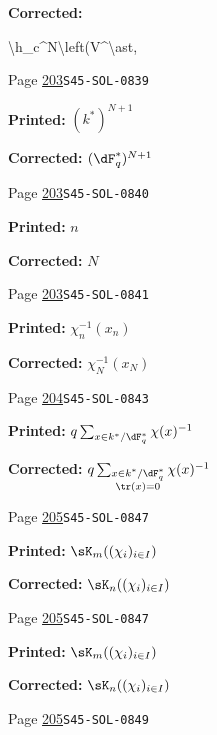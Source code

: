 \begin{description}
\par\noindent\textbf{Corrected:} {\footnotesize\ttfamily\raggedright \textbackslash{}\allowbreak{}h\_\allowbreak{}c\textasciicircum{}\allowbreak{}N\textbackslash{}\allowbreak{}left(\allowbreak{}V\textasciicircum{}\allowbreak{}\textbackslash{}\allowbreak{}ast,\allowbreak{}\par}
\smallskip
\item[\hypertarget{apparatus:EN-0139}{139}] Page \hyperlink{printpage:en:203}{203}\quad\texttt{S45-SOL-0839}
\par\noindent\textbf{Printed:} \((k^\ast)^{N+1}\)
\par\noindent\textbf{Corrected:} \((\dF_q^\ast)^{N+1}\)
\smallskip
\item[\hypertarget{apparatus:EN-0140}{140}] Page \hyperlink{printpage:en:203}{203}\quad\texttt{S45-SOL-0840}
\par\noindent\textbf{Printed:} \(n\)
\par\noindent\textbf{Corrected:} \(N\)
\smallskip
\item[\hypertarget{apparatus:EN-0141}{141}] Page \hyperlink{printpage:en:203}{203}\quad\texttt{S45-SOL-0841}
\par\noindent\textbf{Printed:} \(\chi_n^{-1}(x_n)\)
\par\noindent\textbf{Corrected:} \(\chi_N^{-1}(x_N)\)
\smallskip
\item[\hypertarget{apparatus:EN-0142}{142}] Page \hyperlink{printpage:en:204}{204}\quad\texttt{S45-SOL-0843}
\par\noindent\textbf{Printed:} \(q\sum_{x\in k^\ast/\dF_q^\ast} \chi(x)^{-1}\)
\par\noindent\textbf{Corrected:} \(q\sum_{\substack{x\in k^\ast/\dF_q^\ast\\\tr(x)=0}} \chi(x)^{-1}\)
\smallskip
\item[\hypertarget{apparatus:EN-0143}{143}] Page \hyperlink{printpage:en:205}{205}\quad\texttt{S45-SOL-0847}
\par\noindent\textbf{Printed:} \(\sK_m((\chi_i)_{i\in I})\)
\par\noindent\textbf{Corrected:} \(\sK_n((\chi_i)_{i\in I})\)
\smallskip
\item[\hypertarget{apparatus:EN-0144}{144}] Page \hyperlink{printpage:en:205}{205}\quad\texttt{S45-SOL-0847}
\par\noindent\textbf{Printed:} \(\sK_m((\chi_i)_{i\in I})\)
\par\noindent\textbf{Corrected:} \(\sK_n((\chi_i)_{i\in I})\)
\smallskip
\item[\hypertarget{apparatus:EN-0145}{145}] Page \hyperlink{printpage:en:205}{205}\quad\texttt{S45-SOL-0849}

\end{description}
